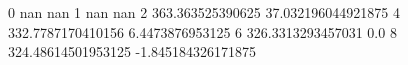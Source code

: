 0 nan nan
1 nan nan
2 363.363525390625 37.032196044921875
4 332.7787170410156 6.4473876953125
6 326.3313293457031 0.0
8 324.48614501953125 -1.845184326171875
